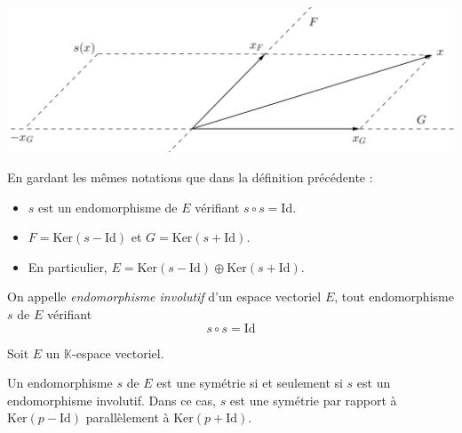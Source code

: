 \documentclass[french,11pt,twoside]{VcCours}
\begin{document}
\begin{center}
\includegraphics[scale=0.37]{Symetrie1}
\end{center}

\begin{Proposition}{} En gardant les mêmes notations que dans la définition précédente :
\begin{itemize}
\item $s$ est un endomorphisme de $E$ vérifiant $s \circ s = \textrm{Id}$.
\item $F = \textrm{Ker}(s-\textrm{Id})$ et $G= \textrm{Ker}(s+\textrm{Id})$.
\item En particulier, $E= \textrm{Ker}(s-\textrm{Id}) \oplus \textrm{Ker}(s+\textrm{Id})$.
\end{itemize}
\end{Proposition}

\begin{Demonstration}{}
\vspace{8cm}
\newpage


\vspace*{7.5cm}

\end{Demonstration}

\begin{Definition}{} 
On appelle \emph{endomorphisme involutif} 
d'un espace vectoriel $E$, tout endomorphisme $s$ de $E$ vérifiant
\[s \circ s = \textrm{Id}\]
\end{Definition}

\begin{Proposition}{} Soit $E$ un $\mathbb{K}$-espace vectoriel.

Un endomorphisme $s$ de $E$ est une symétrie si et seulement si $s$ est un 
endomorphisme involutif. Dans ce cas, $s$ est une symétrie par rapport à 
$\textrm{Ker}(p-\textrm{Id})$ parallèlement à $\textrm{Ker}(p+\textrm{Id})$.
\end{Proposition}

\newpage

\vspace*{7cm}
\end{document}
